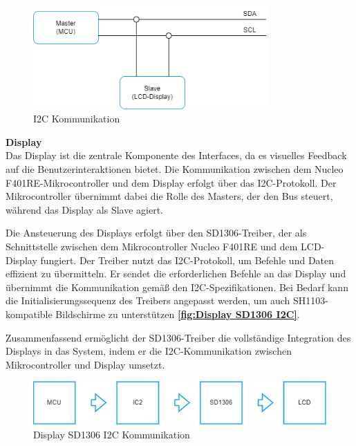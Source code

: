 \begin{figure}[H]
	\centering
	\includegraphics[width=0.8\textwidth]{images/08_durchfuehrung/interface/I2C.drawio.png}
	\caption{I2C Kommunikation}
	\label{fig:I2C}
\end{figure}

\newpage	
\textbf{Display} \\	


Das Display ist die zentrale Komponente des Interfaces, da es visuelles Feedback auf die Benutzerinteraktionen bietet. Die Kommunikation zwischen dem Nucleo F401RE-Mikrocontroller und dem Display erfolgt über das I2C-Protokoll. Der Mikrocontroller übernimmt dabei die Rolle des Masters, der den Bus steuert, während das Display als Slave agiert.

Die Ansteuerung des Displays erfolgt über den SD1306-Treiber, der als Schnittstelle zwischen dem Mikrocontroller Nucleo F401RE und dem LCD-Display fungiert. Der Treiber nutzt das I2C-Protokoll, um Befehle und Daten effizient zu übermitteln. Er sendet die erforderlichen Befehle an das Display und übernimmt die Kommunikation gemäß den I2C-Spezifikationen. Bei Bedarf kann die Initialisierungssequenz des Treibers angepasst werden, um auch SH1103-kompatible Bildschirme zu unterstützen \textbf{\autoref{fig:Display SD1306 I2C}}.

Zusammenfassend ermöglicht der SD1306-Treiber die vollständige Integration des Displays in das System, indem er die I2C-Kommunikation zwischen Mikrocontroller und Display umsetzt. \\ 


\begin{figure}[H]
	\centering
	\includegraphics[width=1.0\textwidth]{images/08_durchfuehrung/interface/Display SD1306 Treiber I2C.drawio}
	\caption{Display SD1306 I2C Kommunikation}
	\label{fig:Display SD1306 I2C}
\end{figure}

